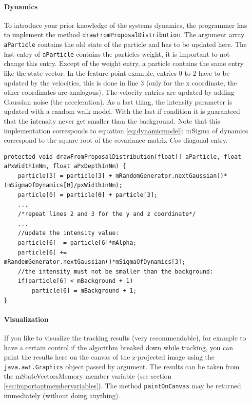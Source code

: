 \documentclass{scrartcl}
\begin{document}
\paragraph{Dynamics}
To introduce your prior knowledge of the systems dynamics, the programmer has to implement the method \texttt{drawFromProposalDistribution}. The argument array \texttt{aParticle} contains the old state of the particle and has to be updated here. The last entry of \texttt{aParticle} contains the particles weight, it is important to not change this entry. Except of the weight entry, a particle contains the same entry like the state vector. 
In the feature point example, entries 0 to 2 have to be updated by the velocities, this is done in line 3 (only for the x coordinate, the other coordinates are analogous). The velocity entries are updated by adding Gaussian noise (the acceleration). As a last thing, the intensity parameter is updated with a random walk model. With the last if condition it is guaranteed that the intensity never get smaller than the background. Note that this implementation corresponds to equation \ref{eq:dynamicmodel}: mSigma of dynamics correspond to the square root of the covariance matrix $Cov$ diagonal entry.
\begin{lstlisting}
protected void drawFromProposalDistribution(float[] aParticle, float aPxWidthInNm, float aPxDepthInNm) {
	particle[3] = particle[3] + mRandomGenerator.nextGaussian()*(mSigmaOfDynamics[0]/pxWidthInNm);
	particle[0] = particle[0] + particle[3];
	...
	/*repeat lines 2 and 3 for the y and z coordinate*/
	...
	//update the intensity value:
	particle[6] -= particle[6]*mAlpha;
	particle[6] += mRandomGenerator.nextGaussian()*mSigmaOfDynamics[3];
	//the intensity must not be smaller than the background:
	if(particle[6] < mBackground + 1)
		particle[6] = mBackground + 1;
}
\end{lstlisting}

\paragraph{Visualization} 
If you like to visualize the tracking results (very recommendable), for example to have a certain control if the algorithm breaked down while tracking, you can paint the results here on the canvas of the z-projected image using the \texttt{java.awt.Graphics} object passed by argument. The results can be taken from the mStateVectorsMemory member variable (see section \ref{sec:importantmembervariables}). The method \texttt{paintOnCanvas} may be returned immediately (without doing anything). 
\end{document}
